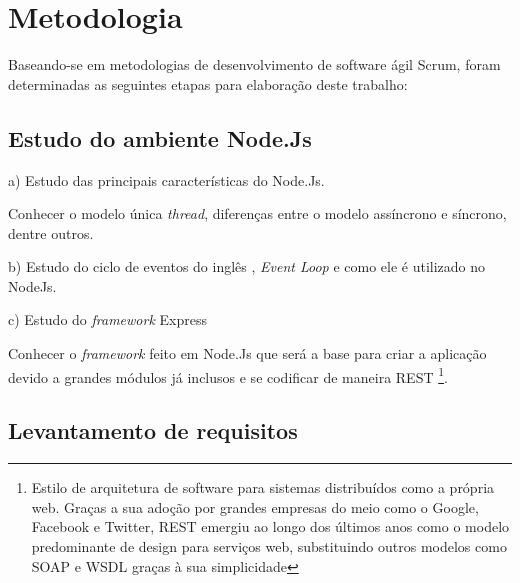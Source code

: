 \chapter{Metodologia}
\label{metodologia}

\vspace{-1.9cm}

  Baseando-se em metodologias de desenvolvimento de software ágil Scrum, foram determinadas 
  as seguintes etapas para elaboração deste trabalho:


\section{Estudo do ambiente Node.Js}
  
  \begin{compactitem}
    \item[a)] Estudo das principais características do Node.Js.
    
    Conhecer o modelo única \textit{thread}, diferenças entre o modelo assíncrono e síncrono, dentre outros.
    
    \item[b)] Estudo do ciclo de eventos do inglês , \textit{Event Loop} e como ele é utilizado no NodeJs.
    
    \item[c)] Estudo do \textit{framework} Express
    
    Conhecer o \textit{framework} feito em Node.Js que será a base para criar a 
    aplicação devido a grandes módulos já inclusos e se codificar de maneira \ac{REST} \footnote{
    Estilo de arquitetura de software para sistemas distribuídos como a própria web. Graças a sua adoção por
    grandes empresas do meio como o Google, Facebook e Twitter, REST emergiu ao longo dos últimos anos como
    o modelo predominante de design para serviços web, substituindo outros modelos como SOAP e WSDL graças
    à sua simplicidade}.

  \end{compactitem}
  
\section{Levantamento de requisitos}

